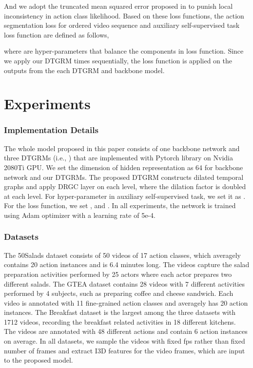 \documentclass[letterpaper]{article} \usepackage{aaai21}  \usepackage{times}  \usepackage{helvet} \usepackage{courier}  \usepackage[hyphens]{url}  \usepackage{graphicx} \usepackage{mathtools}
\begin{document}
And we adopt the truncated mean squared error  proposed in \cite{farha2019ms} to punish local inconsistency in action class likelihood. Based on these loss functions, the action segmentation loss for ordered video sequence and auxiliary self-supervised task loss function are defined as follows,

where  are hyper-parameters that balance the components in loss function. Since we apply our DTGRM  times sequentially, the loss function  is applied on the outputs from the each DTGRM and backbone model. 

\section{Experiments}
\subsubsection{Implementation Details}
The whole model proposed in this paper consists of one backbone network and three DTGRMs (i.e., ) that are implemented with Pytorch library on Nvidia 2080Ti GPU. We set the dimension of hidden representation  as 64 for backbone network and our DTGRMs. The proposed DTGRM constructs  dilated temporal graphs and apply DRGC layer on each level, where the dilation factor is doubled at each level. For hyper-parameter  in auxiliary self-supervised task, we set it as . For the loss function, we set ,  and . In all experiments, the network is trained using Adam optimizer with a learning rate of 5e-4.

\subsubsection{Datasets}
The 50Salads \cite{stein2013combining} dataset consists of 50 videos of 17 action classes, which averagely contains 20 action instances and is 6.4 minutes long. The videos capture the salad preparation activities performed by 25 actors where each actor prepares two different salads. The GTEA \cite{fathi2011learning} dataset contains 28 videos with 7 different activities performed by 4 subjects, such as preparing coffee and cheese sandwich. Each video is annotated with 11 fine-grained action classes and averagely has 20 action instances. The Breakfast \cite{kuehne2014language} dataset is the largest among the three datasets with 1712 videos, recording the breakfast related activities in 18 different kitchens. The videos are annotated with 48 different actions and contain 6 action instances on average. In all datasets, we sample the videos with fixed fps rather than fixed number of frames and extract I3D \cite{carreira2017quo} features for the video frames, which are input to the proposed model.
\end{document}
